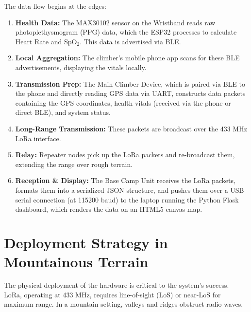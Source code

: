The data flow begins at the edges:
\begin{enumerate}
    \item \textbf{Health Data:} The MAX30102 sensor on the Wristband reads raw photoplethysmogram (PPG) data, which the ESP32 processes to calculate Heart Rate and SpO$_2$. This data is advertised via BLE.
    \item \textbf{Local Aggregation:} The climber's mobile phone app scans for these BLE advertisements, displaying the vitals locally.
    \item \textbf{Transmission Prep:} The Main Climber Device, which is paired via BLE to the phone and directly reading GPS data via UART, constructs data packets containing the GPS coordinates, health vitals (received via the phone or direct BLE), and system status.
    \item \textbf{Long-Range Transmission:} These packets are broadcast over the 433 MHz LoRa interface.
    \item \textbf{Relay:} Repeater nodes pick up the LoRa packets and re-broadcast them, extending the range over rough terrain.
    \item \textbf{Reception \& Display:} The Base Camp Unit receives the LoRa packets, formats them into a serialized JSON structure, and pushes them over a USB serial connection (at 115200 baud) to the laptop running the Python Flask dashboard, which renders the data on an HTML5 canvas map.
\end{enumerate}

\section{Deployment Strategy in Mountainous Terrain}
The physical deployment of the hardware is critical to the system's success. LoRa, operating at 433 MHz, requires line-of-sight (LoS) or near-LoS for maximum range. In a mountain setting, valleys and ridges obstruct radio waves. 

